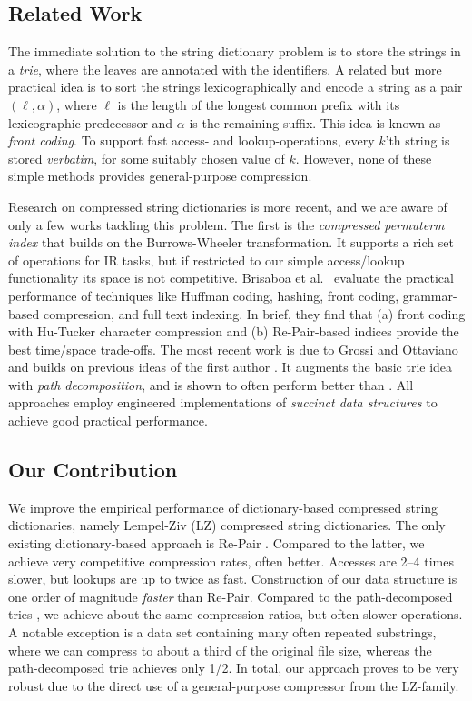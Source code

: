 \documentclass{llncs}
\begin{document}
\subsection{Related Work}
\label{sect:related}
The immediate solution to the string dictionary problem is to store the strings in a \emph{trie}, where the leaves are annotated with the identifiers.
A related but more practical idea is to sort the strings lexicographically and encode a string as a pair $(\ell, \alpha)$, where $\ell$ is the length of the longest common prefix with its lexicographic predecessor and $\alpha$ is the remaining suffix. This idea is known as \emph{front coding}. To support fast access- and lookup-operations, every $k$'th string is stored \emph{verbatim}, for some suitably chosen value of $k$. However, none of these simple methods provides general-purpose compression.

Research on compressed string dictionaries is more recent, and we are aware of only a few works tackling this problem. The first is the \emph{compressed permuterm index} \cite{ferragina10compressed} that builds on the Burrows-Wheeler transformation. It supports a rich set of operations for IR tasks, but if restricted to our simple access/lookup functionality its space is not competitive. Brisaboa et al.~\cite{brisaboa11compressed} evaluate the practical performance of techniques like Huffman coding, hashing, front coding, grammar-based compression, and full text indexing. In brief, they find that (a) front coding with Hu-Tucker character compression and (b) Re-Pair-based indices provide the best time/space trade-offs.
The most recent work is due to Grossi and Ottaviano \cite{grossi12fast} and builds on previous ideas of the first author \cite{ferragina08searching}. It augments the basic trie idea with \emph{path decomposition}, and is shown to often perform better than \cite{brisaboa11compressed}. All approaches employ engineered implementations of \emph{succinct data structures} to achieve good practical performance.

\subsection{Our Contribution}
We improve the empirical performance of dictionary-based compressed string dictionaries, namely Lempel-Ziv (LZ) compressed string dictionaries. The only existing dictionary-based approach is Re-Pair \cite{brisaboa11compressed}. Compared to the latter, we achieve very competitive compression rates, often better. Accesses are 2--4 times slower, but lookups are up to twice as fast. Construction of our data structure is one order of magnitude \emph{faster} than Re-Pair. Compared to the path-decomposed tries \cite{grossi12fast}, we achieve about the same compression ratios, but often slower operations. A notable exception is a data set containing many often repeated substrings, where we can compress to about a third of the original file size, whereas the path-decomposed trie achieves only 1/2. In total, our approach proves to be very robust due to the direct use of a general-purpose compressor from the LZ-family.
\end{document}
